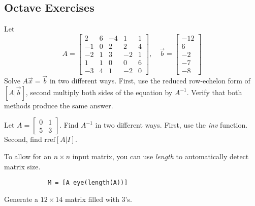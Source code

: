 \documentclass{ximera}
\begin{document}
\subsection*{Octave Exercises}
\begin{problem}\label{prob_oct_mat5}
    Let $$A=\begin{bmatrix}2 & 6 & -4 & 1 & 1\\
-1 & 0 & 2 & 2 & 4\\
-2 & 1 & 3 & -2 & 1\\
1 & 1 & 0 & 0 & 6\\
-3 & 4 & 1 & -2 & 0\end{bmatrix}, \quad \vec{b}=\begin{bmatrix}-12\\
 6\\
 -2\\
 -7\\
 -8\end{bmatrix}$$
Solve $A\vec{x}=\vec{b}$ in two different ways.  First, use the reduced row-echelon form of $[A|\vec{b}]$, second multiply both sides of the equation by $A^{-1}$.  Verify that both methods produce the same answer.
\end{problem}

\begin{problem}\label{prob_oct_mat1}
Let $A=\begin{bmatrix} 0 & 1\\5 & 3\end{bmatrix}$.  Find $A^{-1}$ in two different ways.  First, use the \emph{inv} function.  Second, find $\text{rref}[A|I]$.
    \begin{hint}
        To allow for an $n\times n$ input matrix, you can use \emph{length} to automatically detect matrix size.
        
        \begin{verbatim}
            M = [A eye(length(A))]  
        \end{verbatim}
    \end{hint}
\end{problem}   

\begin{problem}\label{prob_oct_mat4}
    Generate a $12\times 14$ matrix filled with $3$'s.
\end{problem}
\end{document}
